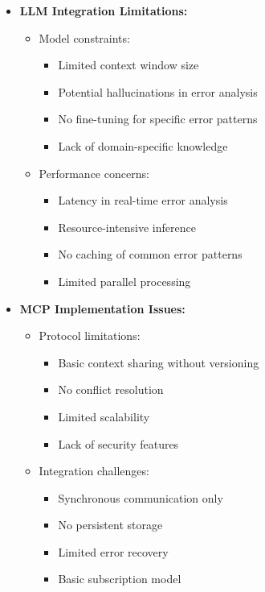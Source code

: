 \begin{itemize}
    \item \textbf{LLM Integration Limitations:}
    \begin{itemize}
        \item Model constraints:
        \begin{itemize}
            \item Limited context window size
            \item Potential hallucinations in error analysis
            \item No fine-tuning for specific error patterns
            \item Lack of domain-specific knowledge
        \end{itemize}
        \item Performance concerns:
        \begin{itemize}
            \item Latency in real-time error analysis
            \item Resource-intensive inference
            \item No caching of common error patterns
            \item Limited parallel processing
        \end{itemize}
    \end{itemize}

    \item \textbf{MCP Implementation Issues:}
    \begin{itemize}
        \item Protocol limitations:
        \begin{itemize}
            \item Basic context sharing without versioning
            \item No conflict resolution
            \item Limited scalability
            \item Lack of security features
        \end{itemize}
        \item Integration challenges:
        \begin{itemize}
            \item Synchronous communication only
            \item No persistent storage
            \item Limited error recovery
            \item Basic subscription model
        \end{itemize}
    \end{itemize}


\end{itemize}
